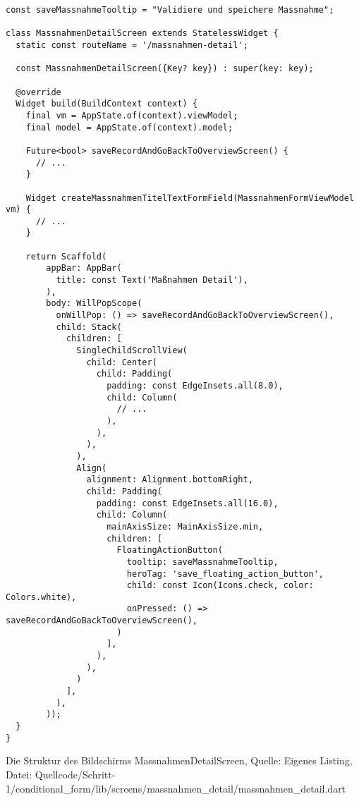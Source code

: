 {\ifincludeall
  \begin{listing}[htbp]
  \renewcommand\theFancyVerbLine{%
\ifnum\value{FancyVerbLine}=20 
  \setcounter{FancyVerbLine}{28}\ldots
\else\ifnum\value{FancyVerbLine}=32
  \setcounter{FancyVerbLine}{46}\ldots
\else\ifnum\value{FancyVerbLine}=62
  \setcounter{FancyVerbLine}{78}\ldots
\else
\arabic{FancyVerbLine}%
\fi
\fi
\fi
}
    \begin{verbatim}
const saveMassnahmeTooltip = "Validiere und speichere Massnahme";

class MassnahmenDetailScreen extends StatelessWidget {
  static const routeName = '/massnahmen-detail';

  const MassnahmenDetailScreen({Key? key}) : super(key: key);

  @override
  Widget build(BuildContext context) {
    final vm = AppState.of(context).viewModel;
    final model = AppState.of(context).model;

    Future<bool> saveRecordAndGoBackToOverviewScreen() {
      // ...
    }

    Widget createMassnahmenTitelTextFormField(MassnahmenFormViewModel vm) {
      // ...
    }

    return Scaffold(
        appBar: AppBar(
          title: const Text('Maßnahmen Detail'),
        ),
        body: WillPopScope(
          onWillPop: () => saveRecordAndGoBackToOverviewScreen(),
          child: Stack(
            children: [
              SingleChildScrollView(
                child: Center(
                  child: Padding(
                    padding: const EdgeInsets.all(8.0),
                    child: Column(
                      // ...
                    ),
                  ),
                ),
              ),
              Align(
                alignment: Alignment.bottomRight,
                child: Padding(
                  padding: const EdgeInsets.all(16.0),
                  child: Column(
                    mainAxisSize: MainAxisSize.min,
                    children: [
                      FloatingActionButton(
                        tooltip: saveMassnahmeTooltip,
                        heroTag: 'save_floating_action_button',
                        child: const Icon(Icons.check, color: Colors.white),
                        onPressed: () => saveRecordAndGoBackToOverviewScreen(),
                      )
                    ],
                  ),
                ),
              )
            ],
          ),
        ));
  }
}
\end{verbatim}
    \caption[Schritt 1 Klasse MassnahmenDetailScreen Struktur]{Die Struktur des Bildschirms MassnahmenDetailScreen, Quelle: Eigenes Listing, Datei: Quellcode/Schritt-1/conditional_form/lib/\newline screens/massnahmen_detail/massnahmen_detail.dart}
    \label{lst:Schritt1KlasseMassnahmenDetailScreenStruktur}
  \end{listing}
\fi

}
